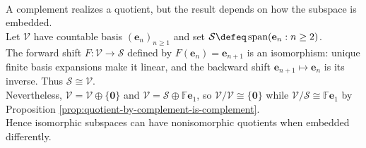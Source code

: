 \begin{perspective} \label{per:quotients-and-complements-are-not-functorial-warnings} \\
A complement realizes a quotient, but the result depends on how the subspace is embedded.\\
Let $\mathcal{V}$ have countable basis $(\mathbf{e}_n)_{n\geq1}$ and set $\mathcal{S}\defeq\operatorname{span}(\mathbf{e}_n:n\geq2)$.\\
The forward shift $F:\mathcal{V}\to\mathcal{S}$ defined by $F(\mathbf{e}_n)=\mathbf{e}_{n+1}$ is an isomorphism: unique finite basis expansions make it linear, and the backward shift $\mathbf{e}_{n+1}\mapsto\mathbf{e}_n$ is its inverse. Thus $\mathcal{S}\cong\mathcal{V}$.\\
Nevertheless, $\mathcal{V}=\mathcal{V}\oplus\{\mathbf{0}\}$ and $\mathcal{V}=\mathcal{S}\oplus\mathbb{F}\mathbf{e}_1$, so $\mathcal{V}/\mathcal{V}\cong\{\mathbf{0}\}$ while $\mathcal{V}/\mathcal{S}\cong\mathbb{F}\mathbf{e}_1$ by Proposition \ref{prop:quotient-by-complement-is-complement}.\\
Hence isomorphic subspaces can have nonisomorphic quotients when embedded differently. 
\end{perspective}
